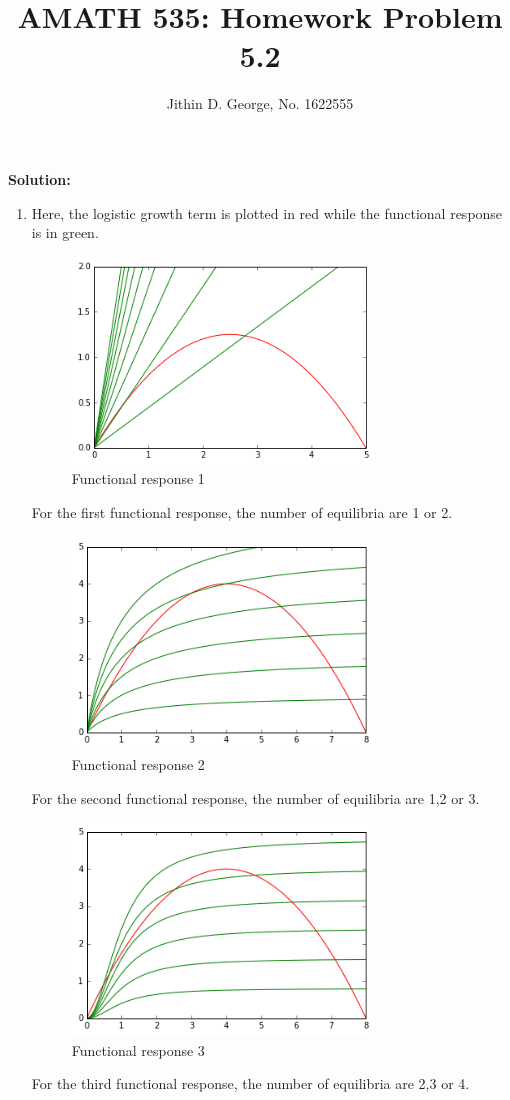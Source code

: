 \documentclass[a4paper,12pt]{article}
\title{\normalsize AMATH 535: Homework Problem 5.2}
\author{\normalsize Jithin D. George, No. 1622555}
\begin{document}
\maketitle
	
{\bf 	} 



{\bf Solution:	}

\begin{enumerate}
	\item
Here, the logistic growth term is plotted in red while the functional response is in green.
\begin{figure}[H] 
	\centering
	\includegraphics[width=8cm]{som2}
	\caption{Functional response 1}
\end{figure}
For the first functional response, the number of equilibria are 1 or 2.
\begin{figure}[H] 
	\centering
	\includegraphics[width=8cm]{som1}
	\caption{Functional response 2}
\end{figure}
For the second functional response, the number of equilibria are 1,2 or 3.




\begin{figure}[H] 
	\centering
	\includegraphics[width=8cm]{som3}
	\caption{Functional response 3}
\end{figure}
For the third functional response, the number of equilibria are 2,3 or 4.



\end{enumerate}
\end{document}
